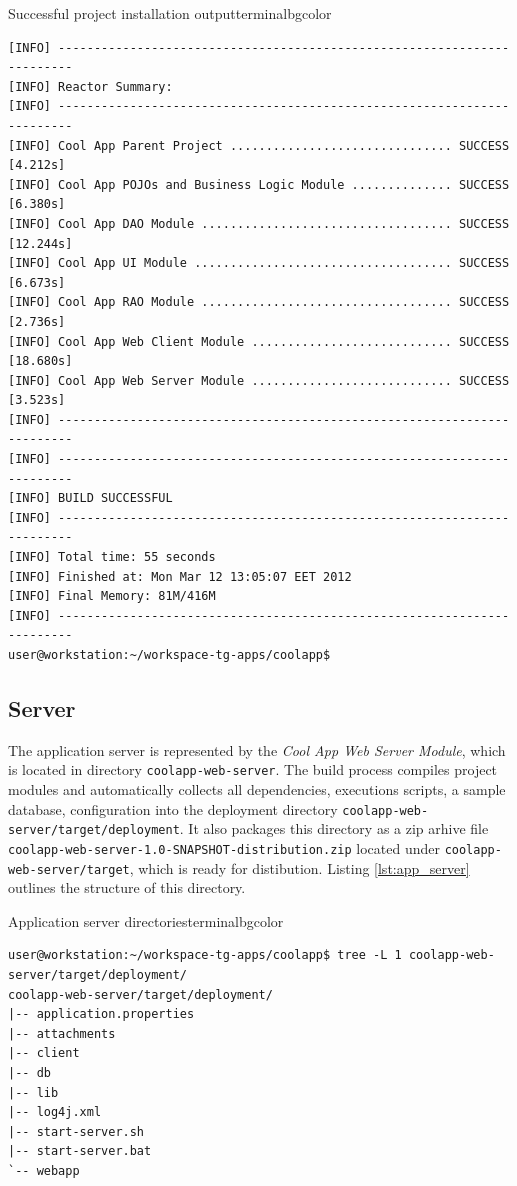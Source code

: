   \begin{code}{Successful project installation output}{\label{lst:mvn_clean_install_completed}}{terminalbgcolor}
      \begin{lstlisting}
[INFO] ------------------------------------------------------------------------
[INFO] Reactor Summary:
[INFO] ------------------------------------------------------------------------
[INFO] Cool App Parent Project ............................... SUCCESS [4.212s]
[INFO] Cool App POJOs and Business Logic Module .............. SUCCESS [6.380s]
[INFO] Cool App DAO Module ................................... SUCCESS [12.244s]
[INFO] Cool App UI Module .................................... SUCCESS [6.673s]
[INFO] Cool App RAO Module ................................... SUCCESS [2.736s]
[INFO] Cool App Web Client Module ............................ SUCCESS [18.680s]
[INFO] Cool App Web Server Module ............................ SUCCESS [3.523s]
[INFO] ------------------------------------------------------------------------
[INFO] ------------------------------------------------------------------------
[INFO] BUILD SUCCESSFUL
[INFO] ------------------------------------------------------------------------
[INFO] Total time: 55 seconds
[INFO] Finished at: Mon Mar 12 13:05:07 EET 2012
[INFO] Final Memory: 81M/416M
[INFO] ------------------------------------------------------------------------
user@workstation:~/workspace-tg-apps/coolapp$ 
      \end{lstlisting}
  \end{code}

\subsection{Server}

  The application server is represented by the \emph{Cool App Web Server Module}, which is located in directory \texttt{coolapp-web-server}.
  The build process compiles project modules and automatically collects all dependencies, executions scripts, a sample database, configuration into the deployment directory \texttt{coolapp-web-server/target/deployment}.
  It also packages this directory as a zip arhive file \texttt{coolapp-web-server-1.0-SNAPSHOT-distribution.zip} located under \texttt{coolapp-web-server/target}, which is ready for distibution.
  Listing \ref{lst:app_server} outlines the structure of this directory.

  \begin{code}{Application server directories}{\label{lst:app_server}}{terminalbgcolor}
     \begin{lstlisting}
user@workstation:~/workspace-tg-apps/coolapp$ tree -L 1 coolapp-web-server/target/deployment/
coolapp-web-server/target/deployment/
|-- application.properties
|-- attachments
|-- client
|-- db
|-- lib
|-- log4j.xml
|-- start-server.sh
|-- start-server.bat
`-- webapp
     \end{lstlisting}
  \end{code}

